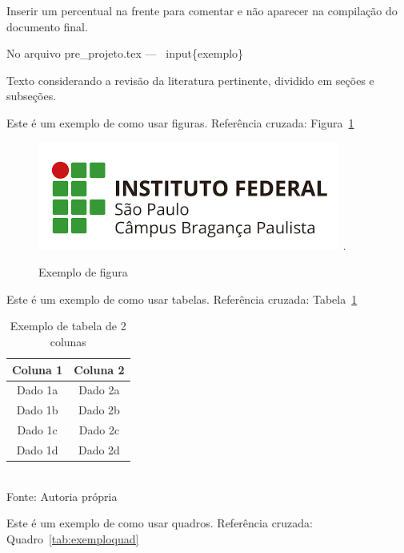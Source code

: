 

Inserir um percentual na frente para comentar e não aparecer na compilação do documento final. 

No arquivo pre\_projeto.tex --- \ input\{exemplo\}

Texto considerando a revisão da literatura pertinente, dividido em seções e subseções.

Este é um exemplo de como usar figuras. Referência cruzada: Figura~\ref{fig:exemplo}


\begin{figure}[!htbp]
	\centering
	\caption{Exemplo de figura}
	\includegraphics[scale=1]{imagens/IFSP-BRA.png}
	.
	\label{fig:exemplo}
\end{figure}



Este é um exemplo de como usar tabelas. Referência cruzada: Tabela~\ref{tab:exemplo}


\begin{table}[!htbp]
\centering
\caption{Exemplo de tabela de 2 colunas}
	\begin{tabular}{ c | c }
		\hline
		\textbf{Coluna 1} & \textbf{Coluna 2} \\ \hline
		Dado 1a           & Dado 2a           \\ \hline
		Dado 1b           & Dado 2b           \\ \hline
		Dado 1c           & Dado 2c           \\ \hline
		Dado 1d           & Dado 2d           \\ \hline
	\end{tabular}
	\\ \vspace{0.2cm}
	Fonte: Autoria própria
	\label{tab:exemplo}
\end{table}



Este é um exemplo de como usar quadros. Referência cruzada: Quadro~\ref{tab:exemploquad}


